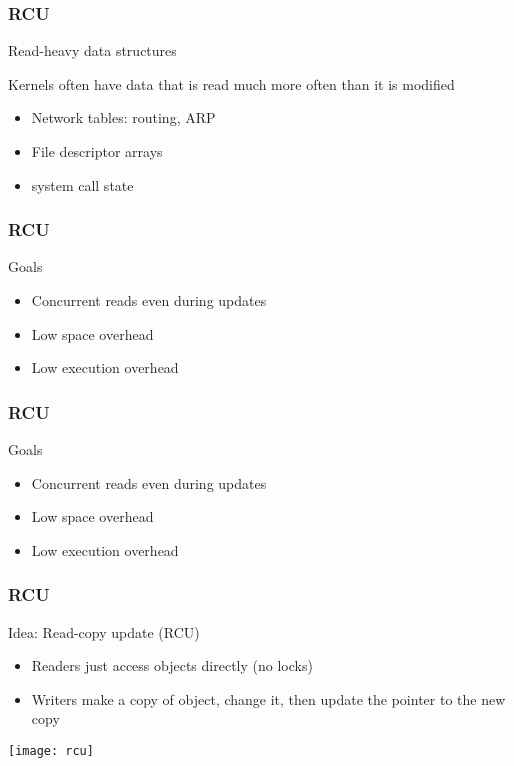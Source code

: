 \begin{frame}[fragile]
    \frametitle{RCU}
    \Large
    Read-heavy data structures
    
    Kernels often have data that is read much more
    often than it is modified
   
    \begin{itemize}
        \item Network tables: routing, ARP
        \item File descriptor arrays
        \item  system call state
    \end{itemize}
    
\end{frame}

\begin{frame}[fragile]
    \frametitle{RCU}
    \Large
   Goals
    
    \begin{itemize}
        \item Concurrent reads even during updates
        \item Low space overhead
        \item Low execution overhead
    \end{itemize}
    
\end{frame}


\begin{frame}[fragile]
    \frametitle{RCU}
    \Large
    Goals
    
    \begin{itemize}
        \item Concurrent reads even during updates
        \item Low space overhead
        \item Low execution overhead
    \end{itemize}
    
\end{frame}

\begin{frame}[fragile]
    \frametitle{RCU}
    \Large
    Idea: Read-copy update (RCU)
    \begin{itemize}
        \item  Readers just access objects directly (no locks)
        \item  Writers make a copy of object, change it, then
        update the pointer to the new copy
    \end{itemize}
    \centering
    \texttt{[image: rcu]}
\end{frame}

